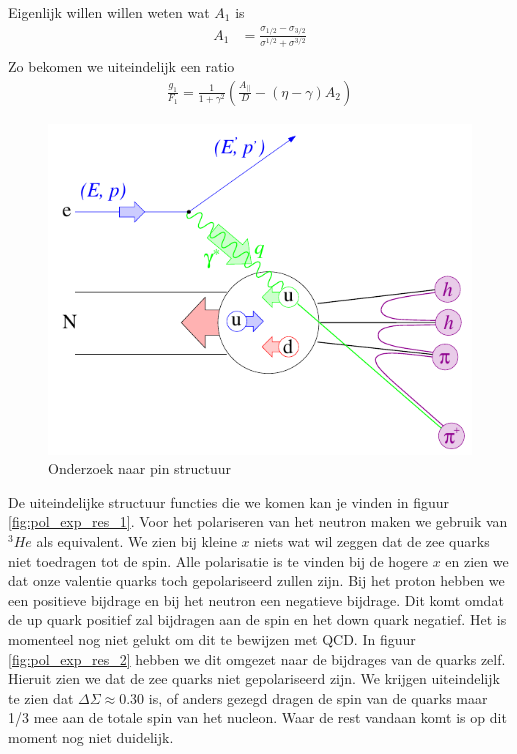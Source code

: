 \documentclass[../main.tex]{subfiles}
\begin{document}
Eigenlijk willen willen weten wat $A_1$ is
\begin{equation}
    \begin{aligned}
        \label{eq:a_parallel}
        A_{1} &= \frac{\sigma_{1/2} - \sigma_{3/2}}{\sigma^{1/2} + \sigma^{3/2}}\\
    \end{aligned}
\end{equation}
Zo bekomen we uiteindelijk een ratio
\begin{equation}
    \begin{aligned}
        \label{eq:pol_ratio_struct_func}
        \frac{g_1}{F_1} = \frac{1}{1+\gamma^2} \left( \frac{A_{||}}{D} - (\eta - \gamma)A_2\right)
    \end{aligned}
\end{equation}

\begin{figure}[h]
    \centering
    \includegraphics[width=0.8\linewidth]{DIS_nucleon_structuur_pdf/foton_abs.png}
    \caption{Onderzoek naar pin structuur}%
    \label{fig:foton_abs}
\end{figure}

De uiteindelijke structuur functies die we komen kan je vinden in figuur \ref{fig:pol_exp_res_1}. Voor het polariseren van het neutron maken we gebruik van $^3He$ als equivalent. We zien bij kleine $x$ niets wat wil zeggen dat de zee quarks niet toedragen tot de spin. Alle polarisatie is te vinden bij de hogere $x$ en zien we dat onze valentie quarks toch gepolariseerd zullen zijn. Bij het proton hebben we een positieve bijdrage en bij het neutron een negatieve bijdrage. Dit komt omdat de up quark positief zal bijdragen aan de spin en het down quark negatief. Het is momenteel nog niet gelukt om dit te bewijzen met QCD. In figuur \ref{fig:pol_exp_res_2} hebben we dit omgezet naar de bijdrages van de quarks zelf. Hieruit zien we dat de zee quarks niet gepolariseerd zijn. We krijgen uiteindelijk te zien dat $\Delta\Sigma \approx 0.30$ is, of anders gezegd dragen de spin van de quarks maar 1/3 mee aan de totale spin van het nucleon. Waar de rest vandaan komt is op dit moment nog niet duidelijk.
\end{document}
